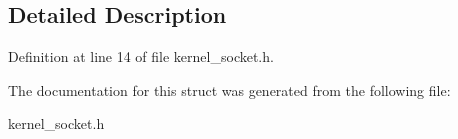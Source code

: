 \subsection{Detailed Description}


Definition at line 14 of file kernel\+\_\+socket.\+h.



The documentation for this struct was generated from the following file\+:\begin{DoxyCompactItemize}
\item 
kernel\+\_\+socket.\+h\end{DoxyCompactItemize}

